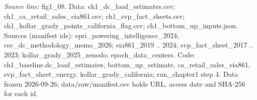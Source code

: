 {\scriptsize\textit{Source line:} fig1\_\allowbreak{}08. Data: ch1\_\allowbreak{}dc\_\allowbreak{}load\_\allowbreak{}estimates.csv; ch1\_\allowbreak{}ca\_\allowbreak{}retail\_\allowbreak{}sales\_\allowbreak{}eia861.csv; ch1\_\allowbreak{}svp\_\allowbreak{}fact\_\allowbreak{}sheets.csv; ch1\_\allowbreak{}kollar\_\allowbreak{}grady\_\allowbreak{}points\_\allowbreak{}california\_\allowbreak{}flag.csv; ch1\_\allowbreak{}bottom\_\allowbreak{}up\_\allowbreak{}inputs.json. Sources (manifest ids): epri\_\allowbreak{}powering\_\allowbreak{}intelligence\_\allowbreak{}2024; cec\_\allowbreak{}dc\_\allowbreak{}methodology\_\allowbreak{}memo\_\allowbreak{}2026; eia861\_\allowbreak{}2019 .. 2024; svp\_\allowbreak{}fact\_\allowbreak{}sheet\_\allowbreak{}2017 .. 2023; kollar\_\allowbreak{}grady\_\allowbreak{}2025\_\allowbreak{}zenodo; epoch\_\allowbreak{}data\_\allowbreak{}centers. Code: ch1\_\allowbreak{}baseline.dc\_\allowbreak{}load\_\allowbreak{}estimates, bottom\_\allowbreak{}up\_\allowbreak{}estimate, ca\_\allowbreak{}retail\_\allowbreak{}sales\_\allowbreak{}eia861, svp\_\allowbreak{}fact\_\allowbreak{}sheet\_\allowbreak{}energy, kollar\_\allowbreak{}grady\_\allowbreak{}california; run\_\allowbreak{}chapter1 step 4. Data frozen 2026-09-26; data/raw/manifest.csv holds URL, access date and SHA-256 for each id.}